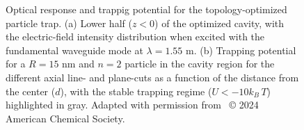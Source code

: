 \begin{figure}[tb]
    \centering
    \caption{Optical response and trappig potential for the topology-optimized particle trap. (a) Lower half ($z<0$) of the optimized cavity, with the electric-field intensity
    distribution when excited with the fundamental waveguide mode at $\lambda=1.55$ \textmu m. (b) Trapping potential for a $R=15$ nm and $n=2$ particle in the cavity region for the different axial line- and plane-cuts as a function
    of the distance from the center ($d$), with the stable trapping regime ($U<-10 k_B\, T$) highlighted in gray. Adapted with permission from~\cite{ownpub1} © 2024 American Chemical Society.}
    \label{fig:MST_dipole}
\end{figure}

